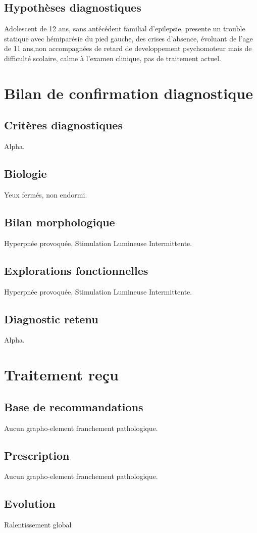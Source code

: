 \documentclass{templates}
\begin{document}
\begin{Clinique}
\subsection*{Hypothèses diagnostiques}
Adolescent de 12 ans, sans antécédent familial d'epilepsie, presente un trouble statique avec hémiparésie du pied gauche, des crises d'absence, évoluant de l'age de 11 ans,non accompagnées de retard de developpement psychomoteur mais de difficulté scolaire, calme à l'examen clinique, pas de traitement actuel.
\section*{Bilan de confirmation diagnostique}
\subsection*{Critères diagnostiques}
Alpha.
\subsection*{Biologie}
Yeux fermés, non endormi.
\subsection*{Bilan morphologique}
Hyperpnée provoquée, Stimulation Lumineuse Intermittente.
\subsection*{Explorations fonctionnelles}
Hyperpnée provoquée, Stimulation Lumineuse Intermittente.
\subsection*{Diagnostic retenu}
Alpha.

\section*{Traitement reçu}
\subsection*{Base de recommandations}
Aucun grapho-element franchement pathologique.
\subsection*{Prescription}
Aucun grapho-element franchement pathologique.
\subsection*{Evolution}
Ralentissement global

\end{Clinique}
\end{document}
